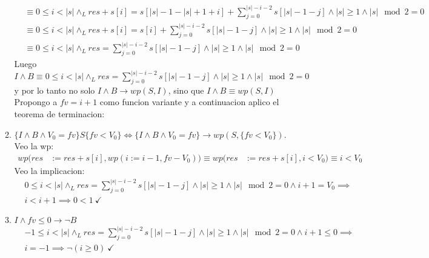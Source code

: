 \documentclass{article}
\begin{document}
\begin{itemize}
\begin{enumerate}
\begin{align}
            &\equiv 0\leq i<|s|\land_L res+s[i]=s[|s|-1-|s|+1+i]+\sum\limits_{j=0}^{|s|-i-2}s[|s|-1-j]\land |s|\geq1 \land |s|\mod2=0\\
            &\equiv 0\leq i<|s|\land_L res+s[i]=s[i]+\sum\limits_{j=0}^{|s|-i-2}s[|s|-1-j]\land |s|\geq1 \land |s|\mod2=0\\
            &\equiv 0\leq i<|s|\land_L res=\sum\limits_{j=0}^{|s|-i-2}s[|s|-1-j]\land |s|\geq1 \land |s|\mod2=0
        \end{align}
        Luego $I\land B\equiv 0\leq i<|s| \land_L res=\sum\limits_{j=0}^{|s|-i-2}s[|s|-1-j]\land |s|\geq1 \land |s|\mod2=0$ y por 
        lo tanto no solo $I\land B\to wp(S,I)$, sino que $I\land B\equiv wp(S,I)$\\

        Propongo a $fv=i+1$ como funcion variante y a continuacion aplico el teorema de terminacion:\\
        \item $\{I\land B\land V_0=fv\}S\{fv<V_0\}\Longleftrightarrow \{I\land B\land V_0=fv\}\to wp(S,\{fv<V_0\})$. Veo la wp:\\
        \cont\begin{align}
            wp(res&:=res+s[i],wp(i:=i-1,fv-V_0))\equiv wp(res&:=res+s[i],i<V_0)\equiv i<V_0
        \end{align}
        Veo la implicacion:\\
        \cont\begin{align}
            &0\leq i<|s| \land_L res=\sum\limits_{j=0}^{|s|-i-2}s[|s|-1-j]\land |s|\geq1 \land |s|\mod2=0 \land i+1=V_0 \implies\\
            &i<i+1 \implies 0<1\ \checkmark
        \end{align}
        
        \item $I\land fv\leq0 \to \neg B$
        \cont\begin{align}
            &-1\leq i<|s| \land_L res=\sum\limits_{j=0}^{|s|-i-2}s[|s|-1-j]\land |s|\geq1 \land |s|\mod2=0 \land i+1\leq0 \implies\\
            &i=-1\implies \neg (i\geq0)\ \checkmark
        \end{align}
    \end{enumerate}
\end{itemize}
\end{document}
